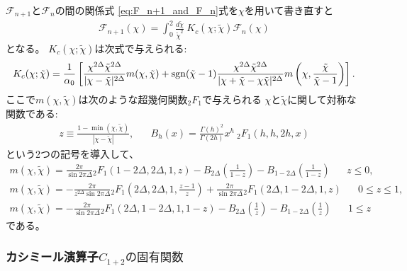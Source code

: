 $\mathcal{F}_{n+1}$と$\mathcal{F}_n$の間の関係式
\eqref{eq:F_n+1_and_F_n}式を$\chi$を用いて書き直すと
\begin{align}
	\mathcal{F}_{n+1}(\chi)
	= \int_0^2 \frac{d\tilde{\chi}}{\tilde{\chi}^2}\ 
		K_c(\chi; \tilde{\chi})\mathcal{F}_n(\chi)
	\label{eq:F_n+1_and_F_n_in_chi}
\end{align}
となる。
$K_c(\chi; \tilde{\chi})$は次式で与えられる:
\begin{align}
	K_c(\chi; \tilde{\chi}) = \frac{1}{\alpha_0}\left[
		\frac{\chi^{2\Delta}\tilde{\chi}^{2\Delta}}{|\chi - \tilde{\chi}|^{2\Delta}}
		m(\chi, \tilde{\chi}) + \mathrm{sgn}(\tilde{\chi} - 1)
		\frac{\chi^{2\Delta}\tilde{\chi}^{2\Delta}}
			 {|\chi + \tilde{\chi} - \chi\tilde{\chi}|^{2\Delta}}
		m\left(\chi, \frac{\tilde{\chi}}{\tilde{\chi} - 1}\right)
	\right].
\end{align}
ここで$m(\chi, \tilde{\chi})$は次のような超幾何関数${}_2F_1$で与えられる
$\chi$と$\tilde{\chi}$に関して対称な関数である:
\begin{align}
	z \equiv \frac{1 - \min(\chi, \tilde{\chi})}{|\chi - \tilde{\chi}|},\hspace{20pt}
	B_h(x) = \frac{\Gamma(h)^2}{\Gamma(2h)}x^h\ {}_2F_1(h, h, 2h, x)
\end{align}
という2つの記号を導入して、
\begin{align}
	m(\chi, \tilde{\chi})
	= \frac{2\pi}{\sin 2\pi\Delta}{}_2F_1(1 - 2\Delta, 2\Delta, 1, z)
	- B_{2\Delta}\left(\frac{1}{1 - z}\right)
	- B_{1 - 2\Delta}\left(\frac{1}{1 - z}\right)
	\hspace{20pt} z \leq 0,
\end{align}
\begin{align}
	m(\chi, \tilde{\chi})
	= -\frac{2\pi}{z^{2\Delta}\sin 2\pi\Delta}{}_2F_1\left(
		2\Delta, 2\Delta, 1, \frac{z - 1}{z}\right)
	+ \frac{2\pi}{\sin 2\pi\Delta}{}_2F_1(2\Delta, 1 - 2\Delta, 1, z)
	\hspace{20pt} 0 \leq z \leq 1,
\end{align}
\begin{align}
	m(\chi, \tilde{\chi})
	= -\frac{2\pi}{\sin 2\pi\Delta}{}_2F_1(2\Delta, 1 - 2\Delta, 1, 1 - z)
	- B_{2\Delta}\left(\frac{1}{z}\right)
	- B_{1 - 2\Delta}\left(\frac{1}{z}\right)
	\hspace{20pt} 1 \leq z 
\end{align}
である。

\subsubsection{カシミール演算子$C_{1+2}の固有関数$}

